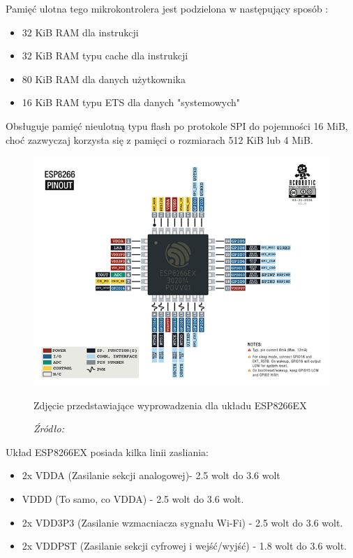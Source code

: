 \documentclass[12pt,a4paper,oneside]{memoir}
\begin{document}
\par Pamięć ulotna tego mikrokontrolera jest podzielona w następujący sposób :
\begin{itemize}
	\item 32 KiB RAM dla instrukcji
	\item 32 KiB RAM typu cache dla instrukcji
	\item 80 KiB RAM dla danych użytkownika
	\item 16 KiB RAM typu ETS dla danych "systemowych"
\end{itemize}
\par Obsługuje pamięć nieulotną typu flash po protokole SPI do pojemności 16 MiB, choć zazwyczaj korzysta się z pamięci o rozmiarach 512 KiB lub 4 MiB.\\
\begin{figure}[h]
	\centering
	\includegraphics[scale=1.5]{images/esp8266_pinout.png}
	{\tytulyrozdzialow \footnotesize \caption[ESP8266EX - opis wyprowadzeń]{Zdjęcie przedstawiające wyprowadzenia dla układu ESP8266EX}
	\caption*{\textit{Źródło: \cite{esp8266pinout}}}}
\end{figure}
\newpage
Układ ESP8266EX posiada kilka linii zasliania:
\begin{itemize}
	\item 2x VDDA (Zasilanie sekcji analogowej)- 2.5 wolt do 3.6 wolt
	\item VDDD (To samo, co VDDA) - 2.5 wolt do 3.6 wolt.
	\item 2x VDD3P3 (Zasilanie wzmacniacza sygnału Wi-Fi) - 2.5 wolt do 3.6 wolt.
	\item 2x VDDPST (Zasilanie sekcji cyfrowej i wejść/wyjść) - 1.8 wolt do 3.6 wolt.
\end{itemize}
\end{document}

